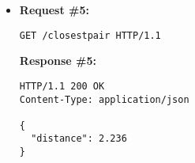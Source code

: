 \begin{itemize}
\item  %
\textbf{Request \#5:}
\begin{lstlisting}[xleftmargin=1pc,numbers=none]
GET /closestpair HTTP/1.1
\end{lstlisting}
\textbf{Response \#5:}
\begin{lstlisting}[xleftmargin=1pc,numbers=none]
HTTP/1.1 200 OK
Content-Type: application/json

{
  "distance": 2.236
}
\end{lstlisting}

\end{itemize}
